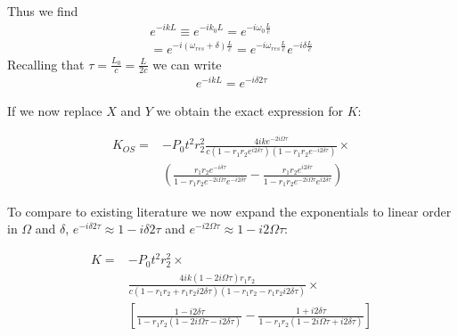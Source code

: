 Thus we find
\newpage
\begin{eqnarray}
e^{-ikL}\equiv e^{-ik_0L}=e^{-i\omega_0 \frac{L}{c}}\nonumber\\
=e^{-i(\omega_{res}+\delta)\frac{L}{c}}=e^{-i\omega_{res}\frac{L}{c}}e^{-i\delta\frac{L}{c}}
\end{eqnarray}
Recalling that $\tau=\frac{L_0}{c}=\frac{L}{2c}$ we can write
\begin{eqnarray}
e^{-ikL}=e^{-i\delta 2\tau}%
\end{eqnarray}


If we now replace $X$ and $Y$ we obtain the exact expression for $K$:%

\begin{eqnarray}
K_{OS}=&-P_0 t^2 r_2^2 \frac{4ike^{-2i\Omega\tau}}{c(1-r_1\!r_2e^{i2\delta\tau})(1-r_1\!r_2e^{-i2\delta\tau})}\times\nonumber\\
 & \left( \frac{r_1\!r_2e^{-i\delta \tau}}{1\!-\!r_1\!r_2e^{-2i\Omega\tau} e^{-i2\delta\tau}}
 \!-\!\frac{r_1\!r_2e^{i2\delta\tau}}{1\!-\!r_1\!r_2e^{-2i\Omega\tau}e^{i2\delta\tau}} \right) 
\end{eqnarray}


To compare to existing literature we now expand the exponentials to linear order 
in $\Omega$ and $\delta$, 
$e^{-i\delta 2\tau}\approx 1-i\delta 2\tau$
and $e^{-i2\Omega \tau}\approx 1-i2\Omega \tau$:

\begin{eqnarray}
K =& -P_0 t^2 r_2^2 \times \nonumber\\
& \frac{4ik(1-2i\Omega\tau)r_1r_2}{c(1-r_1r_2+r_1r_2i2\delta\tau)(1-r_1r_2-r_1r_2i2\delta\tau)}\times\\
& \left[\frac{1-i2\delta\tau}{1-r_1r_2(1-2i\Omega\tau-i2\delta\tau)} -\frac{1+i2\delta\tau}{1-r_1r_2(1-2i\Omega\tau+i2\delta\tau)} \right] \nonumber 
\end{eqnarray}


